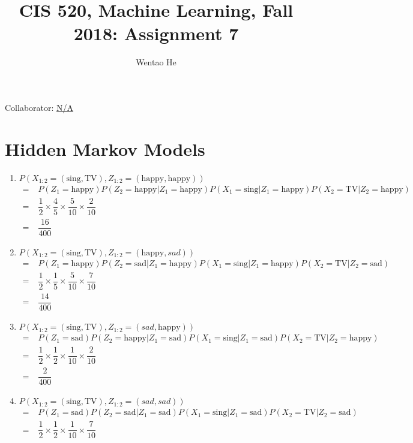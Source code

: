 \documentclass[english]{article}
\title{CIS 520, Machine Learning, Fall 2018: Assignment 7\\}
\date{}
\author{Wentao He}
\begin{document}
\maketitle
{\normalsize Collaborator: \underline{N/A}}

\section{Hidden Markov Models}
\begin{enumerate}
    \item $P(X_{1:2} = (\text{sing}, \text{TV}), Z_{1:2} = (\text{happy}, \text{happy}))$
    \begin{align*}
    = &\; P(Z_1 = \text{happy})P(Z_2 = \text{happy}|Z_1=\text{happy})P(X_1 = \text{sing}|Z_1 = \text{happy})P(X_2 = \text{TV}|Z_2=\text{happy})\\
    = &\; \dfrac{1}{2} \times \dfrac{4}{5} \times \dfrac{5}{10} \times \dfrac{2}{10}\\
    = &\; \dfrac{16}{400}
    \end{align*}
    \item $P(X_{1:2} = (\text{sing}, \text{TV}), Z_{1:2} = (\text{happy}, sad))$
    \begin{align*}
    = &\; P(Z_1 = \text{happy})P(Z_2 = \text{sad}|Z_1=\text{happy})P(X_1 = \text{sing}|Z_1 = \text{happy})P(X_2 = \text{TV}|Z_2=\text{sad})\\
    = &\; \dfrac{1}{2} \times \dfrac{1}{5} \times \dfrac{5}{10} \times \dfrac{7}{10}\\
    = &\; \dfrac{14}{400}
    \end{align*}
    \item $P(X_{1:2} = (\text{sing}, \text{TV}), Z_{1:2} = (sad, \text{happy}))$
    \begin{align*}
    = &\; P(Z_1 = \text{sad})P(Z_2 = \text{happy}|Z_1=\text{sad})P(X_1 = \text{sing}|Z_1 = \text{sad})P(X_2 = \text{TV}|Z_2=\text{happy})\\
    = &\; \dfrac{1}{2} \times \dfrac{1}{2} \times \dfrac{1}{10} \times \dfrac{2}{10}\\
    = &\; \dfrac{2}{400}
    \end{align*}
    \item $P(X_{1:2} = (\text{sing}, \text{TV}), Z_{1:2} = (sad, sad))$
    \begin{align*}
    = &\; P(Z_1 = \text{sad})P(Z_2 = \text{sad}|Z_1=\text{sad})P(X_1 = \text{sing}|Z_1 = \text{sad})P(X_2 = \text{TV}|Z_2=\text{sad})\\
    = &\; \dfrac{1}{2} \times \dfrac{1}{2} \times \dfrac{1}{10} \times \dfrac{7}{10}\\

\end{align*}
\end{enumerate}
\end{document}
